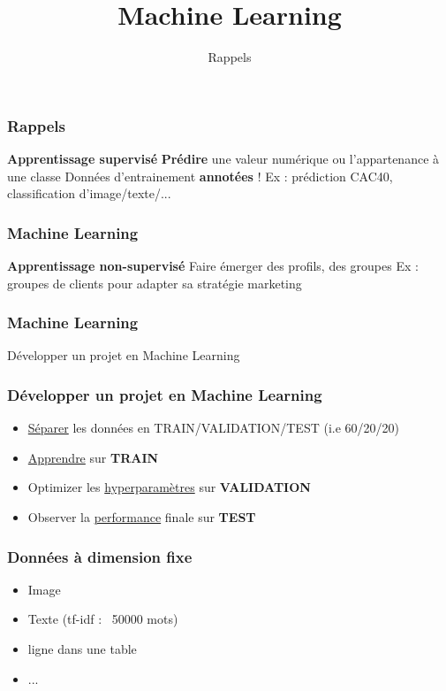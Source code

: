 \documentclass{formation}
\title{Machine Learning}
\subtitle{Rappels}
\begin{document}
\maketitle

\begin{frame}
\frametitle{Rappels}
  \textbf{Apprentissage supervisé}
  \newline \newline
  \textbf{Prédire} une valeur numérique ou l'appartenance à une classe
  \newline
  Données d'entrainement \textbf{annotées} !
  \newline \newline
  Ex : prédiction CAC40, classification d'image/texte/...
\end{frame}

\begin{frame}
  \frametitle{Machine Learning}
  \textbf{Apprentissage non-supervisé}
  \newline \newline
  Faire émerger des profils, des groupes
  \newline \newline
  Ex : groupes de clients pour adapter sa stratégie marketing
\end{frame}

\begin{frame}
  \frametitle{Machine Learning}
  \begin{center}
  Développer un projet en Machine Learning
  \end{center}
\end{frame}

\begin{frame}
  \frametitle{Développer un projet en Machine Learning}
  \begin{itemize}
  \item \underline{Séparer} les données en TRAIN/VALIDATION/TEST (i.e 60/20/20)
  \item \underline{Apprendre} sur \textbf{TRAIN}
  \item Optimizer les \underline{hyperparamètres} sur \textbf{VALIDATION}
  \item Observer la \underline{performance} finale sur \textbf{TEST}
  \end{itemize}
\end{frame}

\begin{frame}
  \frametitle{Données à dimension fixe}
  \begin{itemize}
  \item Image
  \item Texte (tf-idf : ~50000 mots)
  \item ligne dans une table
  \item ...
  \end{itemize}
\end{frame}
\end{document}
